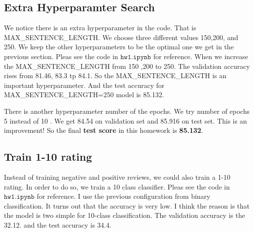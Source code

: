 \documentclass[10pt,a4paper]{article}
\begin{document}
\subsection{Extra Hyperparamter Search}
We notice there is an extra hyperparameter in the code. That is MAX\_SENTENCE\_LENGTH. We choose three different values 150,200, and 250. We keep the other hyperparameters to be the optimal one we get in the previous section. Pleas see the code in $\texttt{hw1.ipynb}$ for reference. When we increase the MAX\_SENTENCE\_LENGTH from 150 ,200 to 250. The validation accuracy rises from 81.46, 83.3 tp 84.1. So the MAX\_SENTENCE\_LENGTH is an important hyperparameter. And the test accuracy for MAX\_SENTENCE\_LENGTH=250 model is 85.132.

There is another hyperparameter number of the epochs.  We try number of epochs 5 instead of 10 . We get 84.54 on validation set and 85.916 on test set. This is an improvement! So the final \textbf{test score} in this homework is \textbf{85.132}. 
\subsection{Train 1-10 rating}
Instead of training negative and positive reviews, we could also train a 1-10 rating. In order to do so, we train a 10 class classifier. Pleas see the code in $\texttt{hw1.ipynb}$ for reference. I use the previous configuration from binary classification. It turns out that the accuracy is very low. I think the reason is that the model is two simple for 10-class classification. The validation accuracy is the 32.12. and the test accuracy is 34.4.
\end{document}

